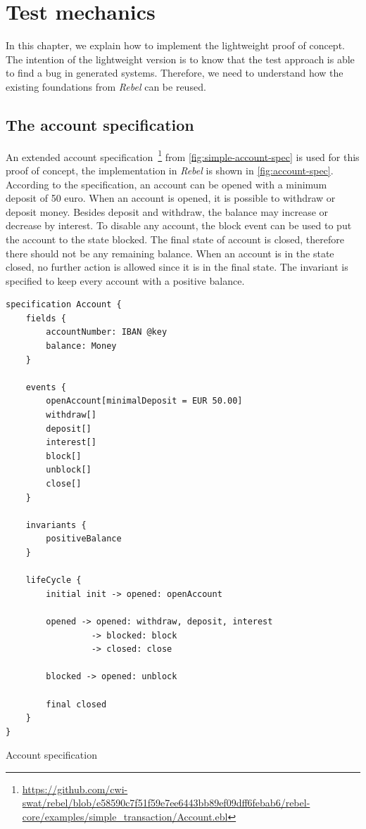 \chapter{Test mechanics}\label{sec:ch3}

In this chapter, we explain how to implement the lightweight proof of concept. The intention of the lightweight version is to know that the test approach is able to find a bug in generated systems. Therefore, we need to understand how the existing foundations from \textit{Rebel} can be reused.


\section{The account specification}
An extended account specification~\footnote{\url{https://github.com/cwi-swat/rebel/blob/e58590c7f51f59e7ee6443bb89ef09dff6febab6/rebel-core/examples/simple_transaction/Account.ebl}} from \autoref{fig:simple-account-spec} is used for this proof of concept, the implementation in \textit{Rebel} is shown in \autoref{fig:account-spec}. According to the specification, an account can be opened with a minimum deposit of 50 euro. When an account is opened, it is possible to withdraw or deposit money. Besides deposit and withdraw, the balance may increase or decrease by interest. To disable any account, the block event can be used to put the account to the state blocked. The final state of account is closed, therefore there should not be any remaining balance. When an account is in the state closed, no further action is allowed since it is in the final state. The invariant is specified to keep every account with a positive balance.


\begin{sourcecode}[h!]
\begin{lstlisting}[]
specification Account {
	fields {
		accountNumber: IBAN @key
		balance: Money
	}

	events {
		openAccount[minimalDeposit = EUR 50.00]
		withdraw[]
		deposit[]
		interest[]
		block[]
		unblock[]
		close[]
	}

	invariants {
		positiveBalance
	}

	lifeCycle {
		initial init -> opened: openAccount

		opened -> opened: withdraw, deposit, interest
			     -> blocked: block
			     -> closed: close

		blocked -> opened: unblock

		final closed
	}
}
\end{lstlisting}
\caption{Account specification}\label{fig:account-spec}
\end{sourcecode}
\FloatBarrier


